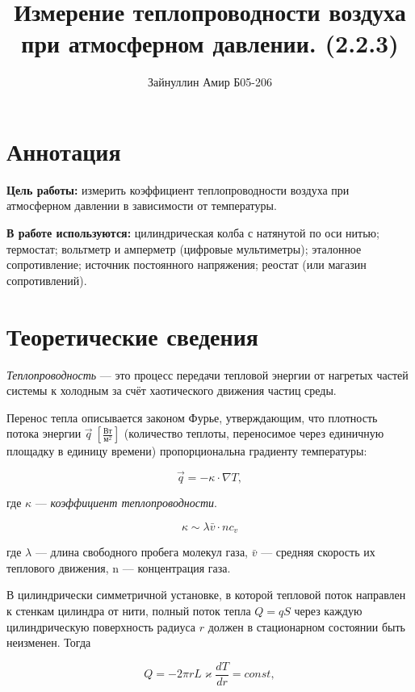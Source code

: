 \documentclass[a4paper,12pt]{article}
\title{\textbf{Измерение теплопроводности воздуха при атмосферном давлении. (2.2.3)}}
\author{Зайнуллин Амир Б05-206}
\begin{document}
\maketitle

\section{Аннотация}

\textbf{Цель работы:} измерить коэффициент теплопроводности воздуха при атмосферном давлении в зависимости от температуры. 

\textbf{В работе используются:} цилиндрическая колба с натянутой по оси нитью; термостат; вольтметр и амперметр (цифровые мультиметры); эталонное сопротивление; источник постоянного напряжения; реостат (или магазин сопротивлений).

\section{Теоретические сведения}

\textit{Теплопроводность} — это процесс передачи тепловой энергии от нагретых частей системы к холодным за счёт хаотического движения частиц среды. 

Перенос тепла описывается законом Фурье, утверждающим, что плотность потока энергии $\vec{q} ~ [\frac{Вт}{м^{2}}]$ (количество теплоты, переносимое   через единичную площадку в единицу времени) пропорциональна градиенту температуры:

\begin{equation*}
	\vec{q} = -\kappa \cdot \nabla T,
\end{equation*}

где $\kappa$ — \textit{коэффициент теплопроводности}.

\begin{equation*}
	\kappa \sim \lambda \bar{v} \cdot n c_v
\end{equation*}

где $\lambda$  — длина свободного пробега молекул газа, $\bar{v}$ — средняя скорость их теплового движения, n — концентрация газа.

В цилиндрически симметричной установке, в которой тепловой поток направлен к стенкам цилиндра от нити, полный поток тепла $Q = qS$ через каждую цилиндрическую поверхность радиуса $r$ должен в стационарном состоянии быть неизменен. Тогда

\begin{equation}
	Q = -2\pi rL\varkappa \frac{dT}{dr} = const,	
\end{equation}
\end{document}
